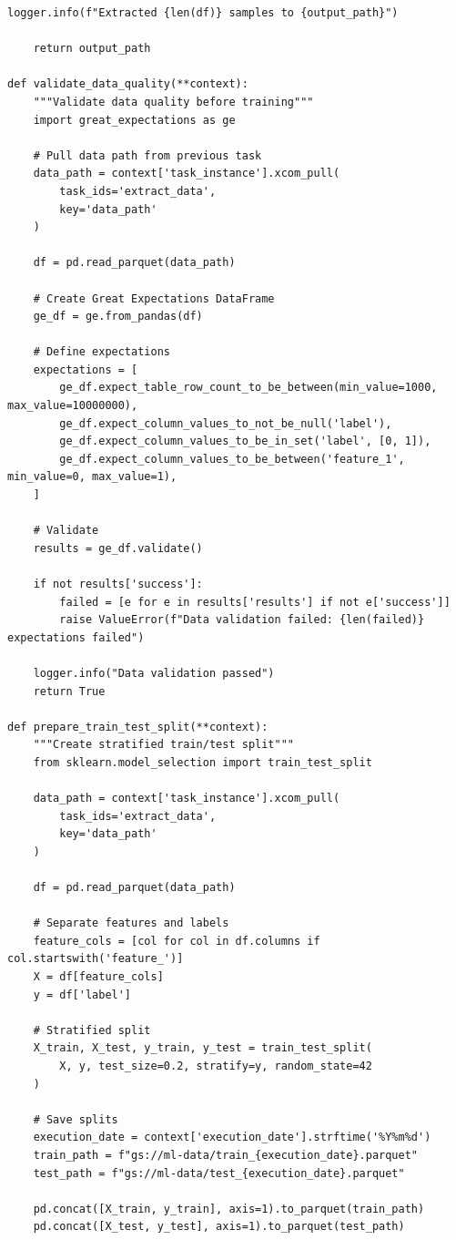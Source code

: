 \begin{lstlisting}[style=python, caption=Comprehensive Airflow ML pipeline with error handling]
    logger.info(f"Extracted {len(df)} samples to {output_path}")

    return output_path

def validate_data_quality(**context):
    """Validate data quality before training"""
    import great_expectations as ge

    # Pull data path from previous task
    data_path = context['task_instance'].xcom_pull(
        task_ids='extract_data',
        key='data_path'
    )

    df = pd.read_parquet(data_path)

    # Create Great Expectations DataFrame
    ge_df = ge.from_pandas(df)

    # Define expectations
    expectations = [
        ge_df.expect_table_row_count_to_be_between(min_value=1000, max_value=10000000),
        ge_df.expect_column_values_to_not_be_null('label'),
        ge_df.expect_column_values_to_be_in_set('label', [0, 1]),
        ge_df.expect_column_values_to_be_between('feature_1', min_value=0, max_value=1),
    ]

    # Validate
    results = ge_df.validate()

    if not results['success']:
        failed = [e for e in results['results'] if not e['success']]
        raise ValueError(f"Data validation failed: {len(failed)} expectations failed")

    logger.info("Data validation passed")
    return True

def prepare_train_test_split(**context):
    """Create stratified train/test split"""
    from sklearn.model_selection import train_test_split

    data_path = context['task_instance'].xcom_pull(
        task_ids='extract_data',
        key='data_path'
    )

    df = pd.read_parquet(data_path)

    # Separate features and labels
    feature_cols = [col for col in df.columns if col.startswith('feature_')]
    X = df[feature_cols]
    y = df['label']

    # Stratified split
    X_train, X_test, y_train, y_test = train_test_split(
        X, y, test_size=0.2, stratify=y, random_state=42
    )

    # Save splits
    execution_date = context['execution_date'].strftime('%Y%m%d')
    train_path = f"gs://ml-data/train_{execution_date}.parquet"
    test_path = f"gs://ml-data/test_{execution_date}.parquet"

    pd.concat([X_train, y_train], axis=1).to_parquet(train_path)
    pd.concat([X_test, y_test], axis=1).to_parquet(test_path)


\end{lstlisting}

